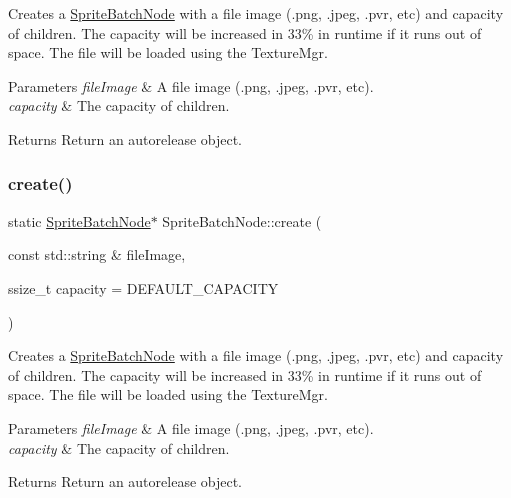 Creates a \hyperlink{classSpriteBatchNode}{Sprite\+Batch\+Node} with a file image (.png, .jpeg, .pvr, etc) and capacity of children. The capacity will be increased in 33\% in runtime if it runs out of space. The file will be loaded using the Texture\+Mgr.


\begin{DoxyParams}{Parameters}
{\em file\+Image} & A file image (.png, .jpeg, .pvr, etc). \\
\hline
{\em capacity} & The capacity of children. \\
\hline
\end{DoxyParams}
\begin{DoxyReturn}{Returns}
Return an autorelease object. 
\end{DoxyReturn}
\mbox{\label{classSpriteBatchNode_a5b81861dc8fe46a8c17b524ad0383029}} 
\subsubsection{\texorpdfstring{create()}{create()}\hspace{0.1cm}{\footnotesize\ttfamily [2/2]}}
{\footnotesize\ttfamily static \hyperlink{classSpriteBatchNode}{Sprite\+Batch\+Node}$\ast$ Sprite\+Batch\+Node\+::create (\begin{DoxyParamCaption}\item[{const std\+::string \&}]{file\+Image,  }\item[{ssize\+\_\+t}]{capacity = {\ttfamily DEFAULT\+\_\+CAPACITY} }\end{DoxyParamCaption})\hspace{0.3cm}{\ttfamily [static]}}

Creates a \hyperlink{classSpriteBatchNode}{Sprite\+Batch\+Node} with a file image (.png, .jpeg, .pvr, etc) and capacity of children. The capacity will be increased in 33\% in runtime if it runs out of space. The file will be loaded using the Texture\+Mgr.


\begin{DoxyParams}{Parameters}
{\em file\+Image} & A file image (.png, .jpeg, .pvr, etc). \\
\hline
{\em capacity} & The capacity of children. \\
\hline
\end{DoxyParams}
\begin{DoxyReturn}{Returns}
Return an autorelease object. 
\end{DoxyReturn}
\mbox{\label{classSpriteBatchNode_a981611b78bc9c5e985ce2b03ecb85b9a}} 
